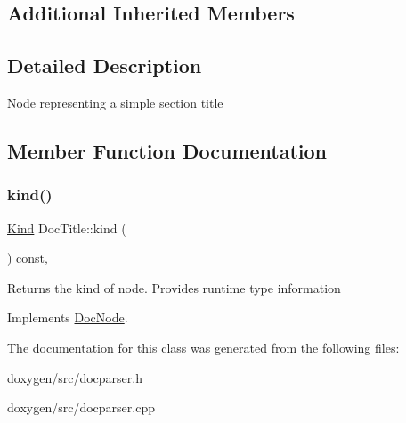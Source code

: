 \subsection*{Additional Inherited Members}


\subsection{Detailed Description}
Node representing a simple section title 

\subsection{Member Function Documentation}
\mbox{\label{class_doc_title_aa737085bbc08de7648765ae79d4f3925}} 
\subsubsection{\texorpdfstring{kind()}{kind()}}
{\footnotesize\ttfamily \mbox{\hyperlink{class_doc_node_aebd16e89ca590d84cbd40543ea5faadb}{Kind}} Doc\+Title\+::kind (\begin{DoxyParamCaption}{ }\end{DoxyParamCaption}) const\hspace{0.3cm}{\ttfamily [inline]}, {\ttfamily [virtual]}}

Returns the kind of node. Provides runtime type information 

Implements \mbox{\hyperlink{class_doc_node_a108ffd214a72ba6e93dac084a8f58049}{Doc\+Node}}.



The documentation for this class was generated from the following files\+:\begin{DoxyCompactItemize}
\item 
doxygen/src/docparser.\+h\item 
doxygen/src/docparser.\+cpp\end{DoxyCompactItemize}
